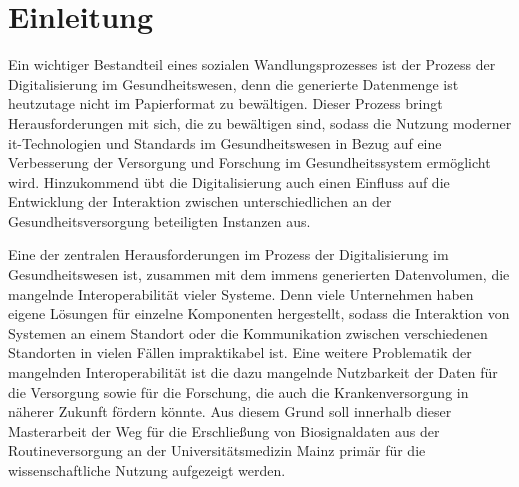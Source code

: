 \chapter{Einleitung} \label{ch:introduction}

Ein wichtiger Bestandteil eines sozialen Wandlungsprozesses ist der Prozess der Digitalisierung im Gesundheitswesen, denn die generierte Datenmenge ist heutzutage nicht im Papierformat zu bewältigen. Dieser Prozess bringt Herausforderungen mit sich, die zu bewältigen sind, sodass die Nutzung moderner \ac{it}-Technologien und Standards im Gesundheitswesen in Bezug auf eine Verbesserung der Versorgung und Forschung im Gesundheitssystem ermöglicht wird. Hinzukommend übt die Digitalisierung auch einen Einfluss auf die Entwicklung der Interaktion zwischen unterschiedlichen an der Gesundheitsversorgung beteiligten Instanzen aus. 

Eine der zentralen Herausforderungen im Prozess der Digitalisierung im Gesundheitswesen ist, zusammen mit dem immens generierten Datenvolumen, die mangelnde Interoperabilität vieler Systeme. Denn viele Unternehmen haben eigene Lösungen für einzelne Komponenten hergestellt, sodass die Interaktion von Systemen an einem Standort oder die Kommunikation zwischen verschiedenen Standorten in vielen Fällen impraktikabel ist. Eine weitere Problematik der mangelnden Interoperabilität ist die dazu mangelnde Nutzbarkeit der Daten für die Versorgung sowie für die Forschung, die auch die Krankenversorgung in näherer Zukunft fördern könnte. Aus diesem Grund soll innerhalb dieser Masterarbeit der Weg für die Erschließung von Biosignaldaten aus der Routineversorgung an der Universitätsmedizin Mainz primär für die wissenschaftliche Nutzung aufgezeigt werden.